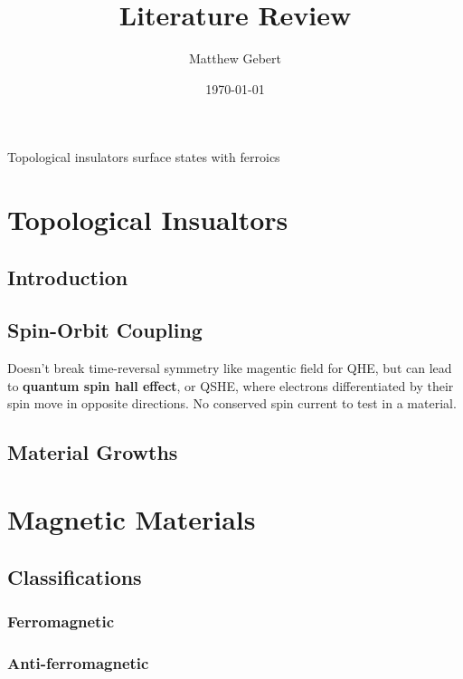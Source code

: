\documentclass{article} %
\title{Literature Review}
\date{\today}
\author{Matthew Gebert}
\begin{document}
	\maketitle
	\begingroup
	\centering
		\vspace{5mm}\LARGE Topological insulators surface states with ferroics\\\vspace{1.5cm}	
	\endgroup
	\normalfont\normalsize
		
		
\section{Topological Insualtors}
\subsection{Introduction}
\subsection{Spin-Orbit Coupling}
Doesn't break time-reversal symmetry like magentic field for QHE, but can lead to \textbf{quantum spin hall effect}, or QSHE, where electrons differentiated by their spin move in opposite directions. No conserved spin current to test in a material.

\subsection{Material Growths}

\section{Magnetic Materials}
\subsection{Classifications}
\subsubsection{Ferromagnetic}
\subsubsection{Anti-ferromagnetic}
\end{document}
